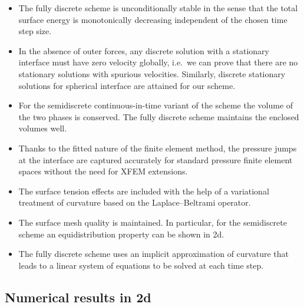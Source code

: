 \documentclass[a4paper,12pt,onecolumn]{article}
\begin{document}
\begin{itemize}
\item The fully discrete scheme is unconditionally stable in the sense that the
total surface energy is monotonically decreasing independent of the chosen time
step size.
\item In the absence of outer forces, any discrete solution with a stationary
interface must have zero velocity globally, i.e.\ we can prove that there are no
stationary solutions with spurious velocities. Similarly, discrete stationary
solutions for spherical interface are attained for our scheme.
\item For the semidiscrete continuous-in-time variant of the scheme the volume
of the two phases is conserved. The fully discrete scheme maintains the enclosed
volumes well.
\item Thanks to the fitted nature of the finite element method, the pressure
jumps at the interface are captured accurately for standard pressure finite
element spaces without the need for XFEM extensions.
\item The surface tension effects are included with the help of a variational
treatment of curvature based on the Laplace--Beltrami operator.
\item The surface mesh quality is maintained. In particular, for the
semidiscrete scheme an equidistribution property can be shown in 2d.
\item The fully discrete scheme uses an implicit approximation of curvature
that leads to a linear system of equations to be solved at each time step.
\end{itemize}

\subsection{Numerical results in 2d} \label{subsec:numerical_results_2d}
\end{document}
